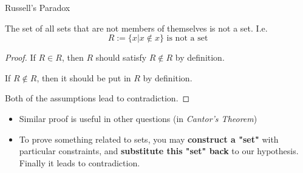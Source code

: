 \begin{frame}{Russell's Paradox}
    \begin{theorem}
        The set of all sets that are not members of themselves is not a set. I.e. $$R:=\{x|x\notin x\} \text{ is not a set}$$
    \end{theorem}
    \begin{proof}
        If $R\in R$, then $R$ should satisfy $R\notin R$ by definition. 
        
        If $R\notin R$, then it should be put in $R$ by definition.

        Both of the assumptions lead to contradiction.
    \end{proof}
    \begin{itemize}
        \item Similar proof is useful in other questions (in \emph{Cantor's Theorem})
        \item To prove something related to sets, you may \textbf{construct a "set"} with particular constraints, and \textbf{substitute this "set" back} to our hypothesis. Finally it leads to contradiction.
    \end{itemize}
\end{frame}